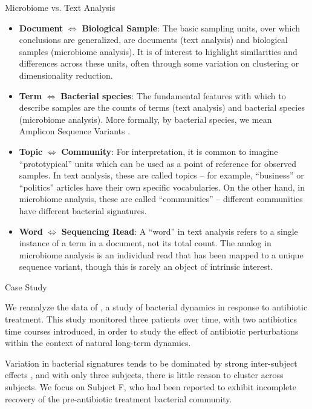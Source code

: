 \documentclass[final]{beamer}
\newlength{\onecolwid}
\begin{document}
\begin{frame}
\begin{columns}
\begin{column}{\onecolwid}
\begin{block}{Microbiome vs. Text Analysis}
\begin{itemize}
  \item \textbf{Document} $\iff$ \textbf{Biological Sample}: The basic sampling
    units, over which conclusions are generalized, are documents (text analysis)
    and biological samples (microbiome analysis). It is of interest to highlight
    similarities and differences across these units, often through some
    variation on clustering or dimensionality reduction.
  \item \textbf{Term} $\iff$ \textbf{Bacterial species}: The fundamental
    features with which to describe samples are the counts of terms (text
    analysis) and bacterial species (microbiome analysis). More formally, by
    bacterial species, we mean Amplicon Sequence Variants
    \citep{callahan2017exact}.
  \item \textbf{Topic} $\iff$ \textbf{Community}: For interpretation, it is
    common to imagine ``prototypical'' units which can be used as a point of
    reference for observed samples. In text analysis, these are called topics --
    for example, ``business'' or ``politics'' articles have their own specific
    vocabularies. On the other hand, in microbiome analysis, these are called
    ``communities'' -- different communities have different bacterial
    signatures.
  \item \textbf{Word} $\iff$ \textbf{Sequencing Read}: A ``word'' in text analysis refers
    to a single instance of a term in a document, not its total count. The
    analog in microbiome analysis is an individual read that has been mapped to
    a unique sequence variant, though this is rarely an object of intrinsic interest.
\end{itemize}
\end{block}

\begin{block}{Case Study}

We reanalyze the data of \cite{dethlefsen2011incomplete}, a study of bacterial
dynamics in response to antibiotic treatment. This study monitored three
patients over time, with two antibiotics time courses introduced, in order to
study the effect of antibiotic perturbations within the context of natural
long-term dynamics.

Variation in bacterial signatures tends to be dominated by strong inter-subject
effects \citep{eckburg2005diversity}, and with only three subjects, there is
little reason to cluster across subjects. We focus on Subject F,
who had been reported to exhibit incomplete recovery of the pre-antibiotic
treatment bacterial community. 
\end{block}
\end{column}


\end{columns}
\end{frame}
\end{document}
